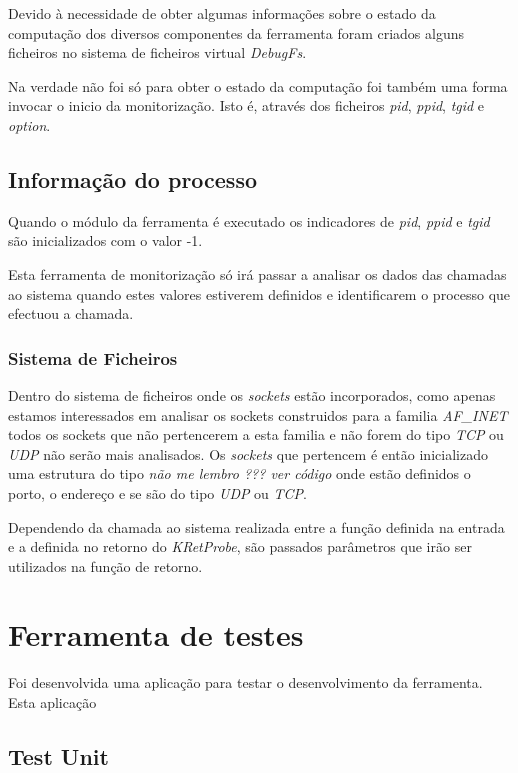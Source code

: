 Devido à necessidade de obter algumas informações sobre o estado da computação
dos diversos componentes da ferramenta foram criados alguns ficheiros no
sistema de ficheiros virtual \textit{DebugFs}.

Na verdade não foi só para obter o estado da computação foi também uma forma
invocar o inicio da monitorização. Isto é, através dos ficheiros \textit{pid},
\textit{ppid}, \textit{tgid} e \textit{option}. 

\subsection{Informação do processo}

Quando o módulo da ferramenta é executado os indicadores de \textit{pid},
\textit{ppid} e \textit{tgid} são inicializados com o valor -1.

Esta ferramenta de monitorização só irá passar a analisar os dados das chamadas
ao sistema quando estes valores estiverem definidos e identificarem o processo
que efectuou a chamada.

\subsubsection{Sistema de Ficheiros}

Dentro do sistema de ficheiros onde os \textit{sockets} estão incorporados,
como apenas estamos interessados em analisar os sockets construidos para a
familia \textit{AF\_INET} todos os sockets que não pertencerem a esta familia e
não forem do tipo \textit{TCP} ou \textit{UDP} não serão mais analisados. Os
\textit{sockets} que pertencem é então inicializado uma estrutura do tipo
\textit{não me lembro ??? ver código} onde estão definidos o porto, o endereço
e se são do tipo \textit{UDP} ou \textit{TCP}.

Dependendo da chamada ao sistema realizada entre a função definida na entrada
e a definida no retorno do \textit{KRetProbe}, são passados parâmetros que irão
ser utilizados na função de retorno.


\section{Ferramenta de testes}

Foi desenvolvida uma aplicação para testar o desenvolvimento da ferramenta.
Esta aplicação 

\subsection{Test Unit}

